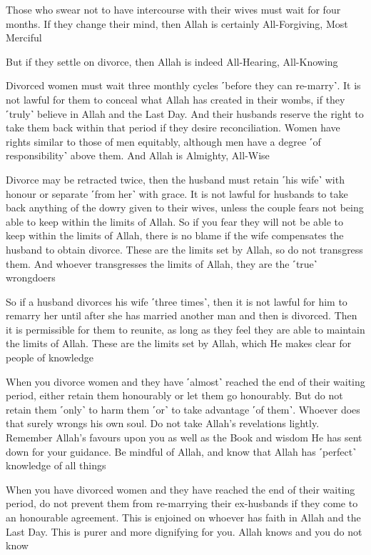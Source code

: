 Those who swear not to have intercourse with their wives must wait for four months. If they change their mind, then Allah is certainly All-Forgiving, Most Merciful

But if they settle on divorce, then Allah is indeed All-Hearing, All-Knowing

Divorced women must wait three monthly cycles ˹before they can re-marry˺. It is not lawful for them to conceal what Allah has created in their wombs, if they ˹truly˺ believe in Allah and the Last Day. And their husbands reserve the right to take them back within that period if they desire reconciliation. Women have rights similar to those of men equitably, although men have a degree ˹of responsibility˺ above them. And Allah is Almighty, All-Wise

Divorce may be retracted twice, then the husband must retain ˹his wife˺ with honour or separate ˹from her˺ with grace. It is not lawful for husbands to take back anything of the dowry given to their wives, unless the couple fears not being able to keep within the limits of Allah. So if you fear they will not be able to keep within the limits of Allah, there is no blame if the wife compensates the husband to obtain divorce. These are the limits set by Allah, so do not transgress them. And whoever transgresses the limits of Allah, they are the ˹true˺ wrongdoers

So if a husband divorces his wife ˹three times˺, then it is not lawful for him to remarry her until after she has married another man and then is divorced. Then it is permissible for them to reunite, as long as they feel they are able to maintain the limits of Allah. These are the limits set by Allah, which He makes clear for people of knowledge

When you divorce women and they have ˹almost˺ reached the end of their waiting period, either retain them honourably or let them go honourably. But do not retain them ˹only˺ to harm them ˹or˺ to take advantage ˹of them˺. Whoever does that surely wrongs his own soul. Do not take Allah’s revelations lightly. Remember Allah’s favours upon you as well as the Book and wisdom He has sent down for your guidance. Be mindful of Allah, and know that Allah has ˹perfect˺ knowledge of all things

When you have divorced women and they have reached the end of their waiting period, do not prevent them from re-marrying their ex-husbands if they come to an honourable agreement. This is enjoined on whoever has faith in Allah and the Last Day. This is purer and more dignifying for you. Allah knows and you do not know

